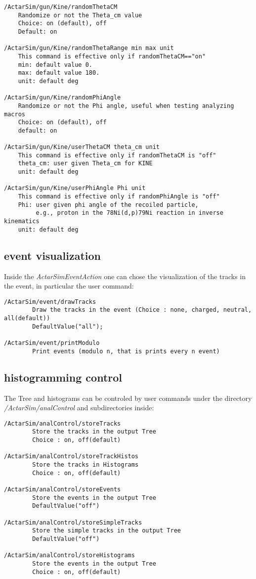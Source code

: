 \begin{verbatim}
/ActarSim/gun/Kine/randomThetaCM
    Randomize or not the Theta_cm value
    Choice: on (default), off
    Default: on

/ActarSim/gun/Kine/randomThetaRange min max unit
    This command is effective only if randomThetaCM=="on"
    min: default value 0.
    max: default value 180.
    unit: default deg

/ActarSim/gun/Kine/randomPhiAngle
    Randomize or not the Phi angle, useful when testing analyzing macros
    Choice: on (default), off
    default: on

/ActarSim/gun/Kine/userThetaCM theta_cm unit
    This command is effective only if randomThetaCM is "off"
    theta_cm: user given Theta_cm for KINE
    unit: default deg

/ActarSim/gun/Kine/userPhiAngle Phi unit
    This command is effective only if randomPhiAngle is "off"
    Phi: user given phi angle of the recoiled particle,
         e.g., proton in the 78Ni(d,p)79Ni reaction in inverse kinematics
    unit: default deg
\end{verbatim}

\subsection{event visualization}

Inside the \textit{ActarSimEventAction} one can chose the visualization of the tracks in the event, in particular the user command:

\begin{verbatim}
/ActarSim/event/drawTracks
        Draw the tracks in the event (Choice : none, charged, neutral, all(default))
        DefaultValue("all");

/ActarSim/event/printModulo
        Print events (modulo n, that is prints every n event)
\end{verbatim}

\subsection{histogramming control}

The Tree and histograms can be controled by user commands under the directory \textit{/ActarSim/analControl} and subdirectories inside:

\begin{verbatim}
/ActarSim/analControl/storeTracks
        Store the tracks in the output Tree
        Choice : on, off(default)

/ActarSim/analControl/storeTrackHistos
        Store the tracks in Histograms
        Choice : on, off(default)

/ActarSim/analControl/storeEvents
        Store the events in the output Tree
        DefaultValue("off")

/ActarSim/analControl/storeSimpleTracks
        Store the simple tracks in the output Tree
        DefaultValue("off")

/ActarSim/analControl/storeHistograms
        Store the events in the output Tree
        Choice : on, off(default)
\end{verbatim}
